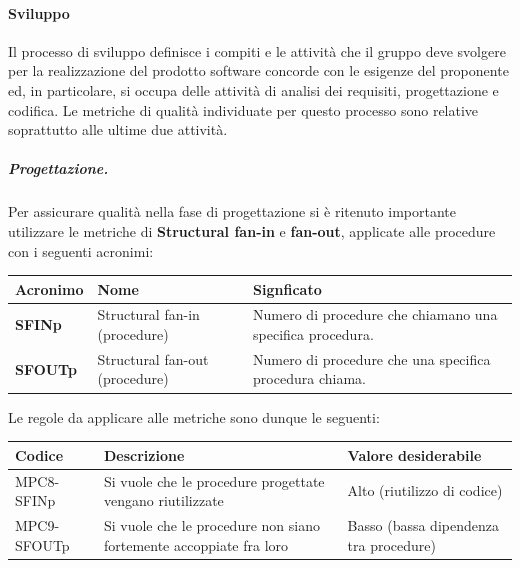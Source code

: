 \paragraph{Sviluppo}
Il processo di sviluppo definisce i compiti e le attività che il gruppo deve svolgere per la
realizzazione del prodotto software concorde con le esigenze del proponente ed, in particolare, si occupa delle attività di analisi dei requisiti, progettazione e codifica. Le metriche di qualità individuate per questo processo sono relative soprattutto alle ultime due attività.
\subparagraph{Progettazione.} Per assicurare qualità nella fase di progettazione si è ritenuto importante utilizzare le metriche di \textbf{Structural fan-in} e \textbf{fan-out}, applicate alle procedure con i seguenti acronimi:
\begin{table}[h!]
\centering
\def\arraystretch{1.5}
\begin{tabular}{ |m{2cm}|m{4cm}|m{8cm}| }
\hline
\rowcolor{lightgray!30}
\textbf{Acronimo} & \textbf{Nome} & \textbf{Signficato}\\
\hline
\textbf{SFINp} & Structural fan-in (procedure) & Numero di procedure che chiamano una specifica procedura.\\
\hline
\textbf{SFOUTp} & Structural fan-out (procedure) & Numero di procedure che una specifica procedura chiama.\\
\hline
\end{tabular}
\end{table}

\newpage
Le regole da applicare alle metriche sono dunque le seguenti:
\begin{table}[h!]
\centering
\def\arraystretch{1.5}
\begin{tabular}{ |>{\centering\arraybackslash}m{4cm}|>{\centering\arraybackslash}m{5.5cm}|>{\centering\arraybackslash}m{5cm}| }
\hline
\rowcolor{black}
\textbf{\color{white} Codice} & \textbf{\color{white} Descrizione} & \textbf{\color{white} Valore desiderabile}\\
\hline
MPC8-SFINp & Si vuole che le procedure progettate vengano riutilizzate & Alto (riutilizzo di codice) \\
\hline
MPC9-SFOUTp & Si vuole che le procedure non siano fortemente accoppiate fra loro & Basso (bassa dipendenza tra procedure) \\
\hline
\end{tabular}
\end{table}


